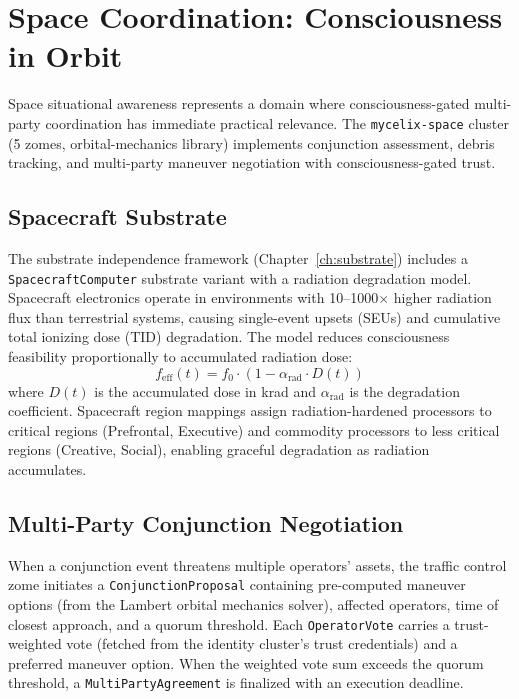 \documentclass[12pt]{book}
\begin{document}


\chapter{Space Coordination: Consciousness in Orbit}
\label{ch:space}

Space situational awareness represents a domain where consciousness-gated multi-party coordination has immediate practical relevance. The \texttt{mycelix-space} cluster (5 zomes, orbital-mechanics library) implements conjunction assessment, debris tracking, and multi-party maneuver negotiation with consciousness-gated trust.

\section{Spacecraft Substrate}

The substrate independence framework (Chapter~\ref{ch:substrate}) includes a \texttt{SpacecraftComputer} substrate variant with a radiation degradation model. Spacecraft electronics operate in environments with 10--1000$\times$ higher radiation flux than terrestrial systems, causing single-event upsets (SEUs) and cumulative total ionizing dose (TID) degradation. The model reduces consciousness feasibility proportionally to accumulated radiation dose:
\begin{equation}
f_{\text{eff}}(t) = f_0 \cdot (1 - \alpha_{\text{rad}} \cdot D(t))
\end{equation}
where $D(t)$ is the accumulated dose in krad and $\alpha_{\text{rad}}$ is the degradation coefficient. Spacecraft region mappings assign radiation-hardened processors to critical regions (Prefrontal, Executive) and commodity processors to less critical regions (Creative, Social), enabling graceful degradation as radiation accumulates.

\section{Multi-Party Conjunction Negotiation}

When a conjunction event threatens multiple operators' assets, the traffic control zome initiates a \texttt{ConjunctionProposal} containing pre-computed maneuver options (from the Lambert orbital mechanics solver), affected operators, time of closest approach, and a quorum threshold. Each \texttt{OperatorVote} carries a trust-weighted vote (fetched from the identity cluster's trust credentials) and a preferred maneuver option. When the weighted vote sum exceeds the quorum threshold, a \texttt{MultiPartyAgreement} is finalized with an execution deadline.
\end{document}
